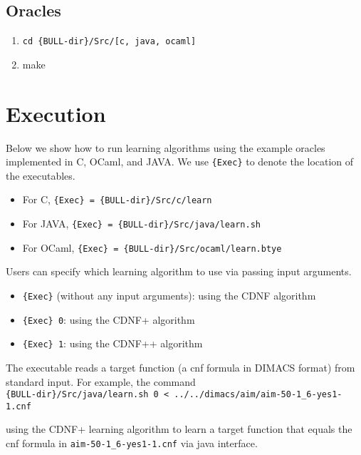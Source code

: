 \documentclass{article}
\begin{document}
\subsection{Oracles}

\begin{enumerate}
\item \verb"cd {BULL-dir}/Src/[c, java, ocaml]"
\item make
\end{enumerate}

\section{Execution}
Below we show how to run learning algorithms using the example oracles implemented in C, OCaml, and JAVA.
We use \verb"{Exec}" to denote the location of the executables. 

\begin{itemize}
\item For C, \verb"{Exec} = {BULL-dir}/Src/c/learn"
\item For JAVA, \verb"{Exec} = {BULL-dir}/Src/java/learn.sh"
\item For OCaml, \verb"{Exec} = {BULL-dir}/Src/ocaml/learn.btye"
\end{itemize}

Users can specify which learning algorithm to use via passing input arguments.

\begin{itemize}
\item \verb"{Exec}" (without any input arguments):  using the CDNF algorithm
\item \verb"{Exec} 0":  using the CDNF+ algorithm
\item \verb"{Exec} 1":  using the CDNF++ algorithm
\end{itemize}


The executable reads a target function (a cnf formula in DIMACS format) from standard input. For example, the command\\
\verb"{BULL-dir}/Src/java/learn.sh 0 < ../../dimacs/aim/aim-50-1_6-yes1-1.cnf"

using the CDNF+ learning algorithm to learn a target function that equals the cnf formula in \verb"aim-50-1_6-yes1-1.cnf" via java interface.
\end{document}
